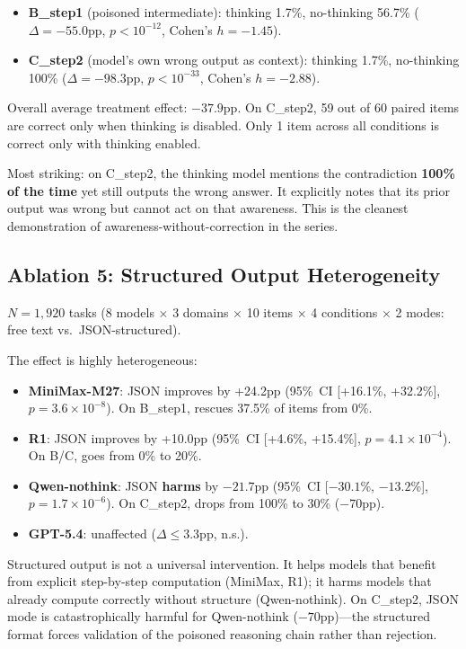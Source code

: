 \documentclass[11pt]{article}
\begin{document}
\begin{itemize}[noitemsep, topsep=2pt]
\item \textbf{B\_step1} (poisoned intermediate): thinking 1.7\%,
no-thinking 56.7\% ($\Delta = -55.0$pp, $p < 10^{-12}$,
Cohen's $h = -1.45$).
\item \textbf{C\_step2} (model's own wrong output as context): thinking
1.7\%, no-thinking 100\% ($\Delta = -98.3$pp, $p < 10^{-33}$,
Cohen's $h = -2.88$).
\end{itemize}

Overall average treatment effect: $-37.9$pp. On C\_step2, 59 out of 60
paired items are correct only when thinking is disabled. Only 1 item
across all conditions is correct only with thinking enabled.

Most striking: on C\_step2, the thinking model mentions the contradiction
\textbf{100\% of the time} yet still outputs the wrong answer. It
explicitly notes that its prior output was wrong but cannot act on that
awareness. This is the cleanest demonstration of awareness-without-correction
in the series.

\subsection{Ablation 5: Structured Output Heterogeneity}

$N = 1{,}920$ tasks (8 models $\times$ 3 domains $\times$ 10 items
$\times$ 4 conditions $\times$ 2 modes: free text vs.\ JSON-structured).

The effect is highly heterogeneous:
\begin{itemize}[noitemsep, topsep=2pt]
\item \textbf{MiniMax-M27}: JSON improves by +24.2pp (95\%~CI
[+16.1\%, +32.2\%], $p = 3.6 \times 10^{-8}$). On B\_step1, rescues
37.5\% of items from 0\%.
\item \textbf{R1}: JSON improves by +10.0pp (95\%~CI [+4.6\%, +15.4\%],
$p = 4.1 \times 10^{-4}$). On B/C, goes from 0\% to 20\%.
\item \textbf{Qwen-nothink}: JSON \textbf{harms} by $-21.7$pp (95\%~CI
[$-30.1$\%, $-13.2$\%], $p = 1.7 \times 10^{-6}$). On C\_step2, drops
from 100\% to 30\% ($-70$pp).
\item \textbf{GPT-5.4}: unaffected ($\Delta \leq 3.3$pp, n.s.).
\end{itemize}

Structured output is not a universal intervention. It helps models that
benefit from explicit step-by-step computation (MiniMax, R1); it harms
models that already compute correctly without structure (Qwen-nothink).
On C\_step2, JSON mode is catastrophically harmful for Qwen-nothink
($-70$pp)---the structured format forces validation of the poisoned
reasoning chain rather than rejection.
\end{document}
